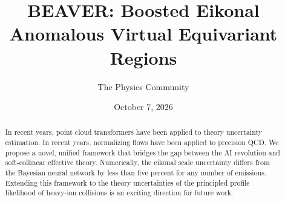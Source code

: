 \documentclass[11pt]{article}
\title{BEAVER: Boosted Eikonal Anomalous Virtual Equivariant Regions}
\author{The Physics Community}
\date{October 7, 2026}
\begin{document}
\maketitle
\begin{abstract}
In recent years, point cloud transformers have been applied to theory
uncertainty estimation. In recent years, normalizing flows have been
applied to precision QCD. We propose a novel, unified framework that
bridges the gap between the AI revolution and soft-collinear effective
theory. Numerically, the eikonal scale uncertainty differs from the
Bayesian neural network by less than five percent for any number of
emissions. Extending this framework to the theory uncertainties of the
principled profile likelihood of heavy-ion collisions is an exciting
direction for future work.
\end{abstract}
\tableofcontents





\nocite{*}


\end{document}
